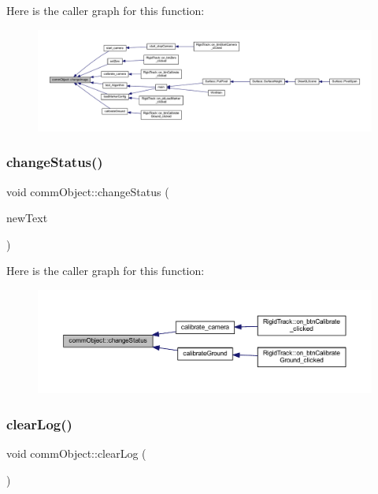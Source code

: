 Here is the caller graph for this function\+:\nopagebreak
\begin{figure}[H]
\begin{center}
\leavevmode
\includegraphics[width=350pt]{classcomm_object_a6f81522c2aa1668fa402f08710e6206b_icgraph}
\end{center}
\end{figure}
\mbox{\label{classcomm_object_a1f4b8dd22ecc46bab619f6b1fe1a5144}} 
\subsubsection{change\+Status()}
{\footnotesize\ttfamily void comm\+Object\+::change\+Status (\begin{DoxyParamCaption}\item[{Q\+String}]{new\+Text }\end{DoxyParamCaption})}

Here is the caller graph for this function\+:\nopagebreak
\begin{figure}[H]
\begin{center}
\leavevmode
\includegraphics[width=350pt]{classcomm_object_a1f4b8dd22ecc46bab619f6b1fe1a5144_icgraph}
\end{center}
\end{figure}
\mbox{\label{classcomm_object_a785f776d16f1871786bb88482fc4dd1f}} 
\subsubsection{clear\+Log()}
{\footnotesize\ttfamily void comm\+Object\+::clear\+Log (\begin{DoxyParamCaption}{ }\end{DoxyParamCaption})}


